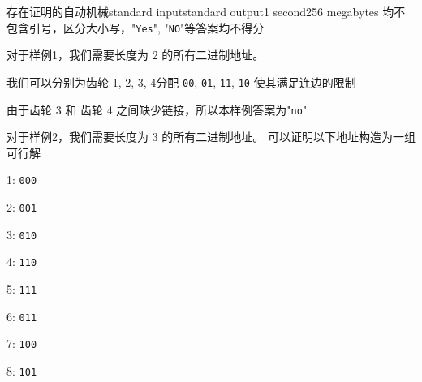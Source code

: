\begin{problem}{存在证明的自动机械}{standard input}{standard output}{1 second}{256 megabytes}
均不包含引号，区分大小写，"\texttt{Yes}", "\texttt{NO}"等答案均不得分

\Example

\begin{example}
%
%
\end{example}

\Note

对于样例1，我们需要长度为 2 的所有二进制地址。

我们可以分别为齿轮 1, 2, 3, 4分配 \texttt{00}, \texttt{01}, \texttt{11}, \texttt{10} 使其满足连边的限制

由于齿轮 3 和 齿轮 4 之间缺少链接，所以本样例答案为"\texttt{no}"


对于样例2，我们需要长度为 3 的所有二进制地址。
可以证明以下地址构造为一组可行解

1: \texttt{000}

2: \texttt{001}

3: \texttt{010}

4: \texttt{110}

5: \texttt{111}

6: \texttt{011}

7: \texttt{100}

8: \texttt{101}

\end{problem}


